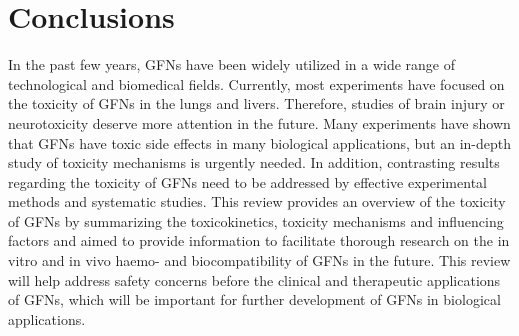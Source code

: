 \documentclass[twoside,twocolumn,9pt]{article}
\renewcommand{\refname}{Notes and references}
\begin{document}
\section{Conclusions}
In the past few years, GFNs have been widely utilized in a wide range of technological and biomedical fields. Currently, most experiments have focused on the toxicity of GFNs in the lungs and livers. Therefore, studies of brain injury or neurotoxicity deserve more attention in the future. Many experiments have shown that GFNs have toxic side effects in many biological applications, but an in-depth study of toxicity mechanisms is urgently needed. In addition, contrasting results regarding the toxicity of GFNs need to be addressed by effective experimental methods and systematic studies. This review provides an overview of the toxicity of GFNs by summarizing the toxicokinetics, toxicity mechanisms and influencing factors and aimed to provide information to facilitate thorough research on the in vitro and in vivo haemo- and biocompatibility of GFNs in the future. This review will help address safety concerns before the clinical and therapeutic applications of GFNs, which will be important for further development of GFNs in biological applications.



\balance


\end{document}
